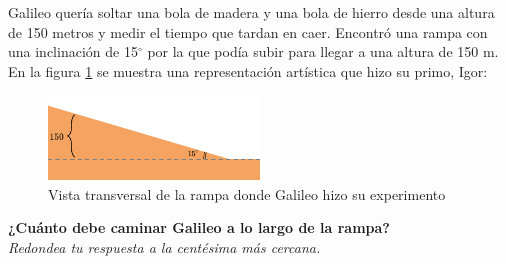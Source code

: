 Galileo quería soltar una bola de madera y una bola de hierro desde una altura de 150 metros y medir el tiempo que tardan en caer.
Encontró una rampa con una inclinación de 15$^\circ$ por la que podía subir para llegar a una altura de 150 m.
En la figura \ref{fig:igor} se muestra una representación art\'istica que hizo su primo, Igor:
\begin{figure}[H]
    \begin{center}
        \includegraphics[width=0.5\textwidth]{../images/igor.png}
    \end{center}
    \caption{Vista transversal de la rampa donde Galileo hizo su experimento}
    \label{fig:igor}
\end{figure}
\textbf{¿Cuánto debe caminar Galileo a lo largo de la rampa?}\\
\textit{Redondea tu respuesta a la centésima más cercana.}